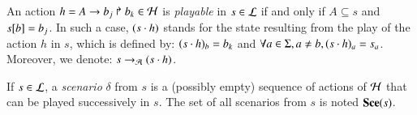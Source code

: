 \begin{definition}
\label{def:play}
  An action $h = A\rightarrow b_j\Rsh b_k \in \mathcal{H}$ is \emph{playable} in $s \in \mathcal{L}$
  if and only if $A \subseteq s$ and ${s[b]} = b_j$.
  In such a case, $(s \cdot h)$ stands for the state resulting from the play of the action $h$ in $s$, which is defined by:
    $(s \cdot h)_b = b_k$
	and
	$\forall a\in\Sigma, a\neq b, (s\cdot h)_a = s_a$.
  Moreover, we denote: $s \rightarrow_{\mathcal{A}} (s \cdot h)$.

  If $s \in \mathcal{L}$,
  a \emph{scenario} $\delta$ from $s$ is a (possibly empty) sequence of actions of $\mathcal{H}$
  that can be played successively in $s$.
  The set of all scenarios from $s$ is noted $\mathbf{Sce}(s)$.
\end{definition}



